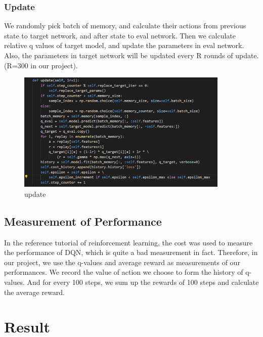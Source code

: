 \documentclass[12pt]{article}
\begin{document}
\subsubsection{Update}
We randomly pick batch of memory, and calculate their actions from previous state to target network, and after state to eval network. Then we calculate relative q values of target model, and update the parameters in eval network. Also, the parameters in target network will be updated every R rounds of update.(R=300 in our project).
\begin{figure}[H]
	\begin{center}
		\includegraphics[width=0.9\textwidth]{update}
		\caption{update}
	\end{center}
\end{figure}

\subsection{Measurement of Performance}
In the reference tutorial of reinforcement learning, the cost was used to measure the performance of DQN, which is quite a bad measurement in fact. Therefore, in our project, we use the q-values and average reward as measurements of our performances. We record the value of action we choose to form the history of q-values. And for every 100 steps, we sum up the rewards of 100 steps and calculate the average reward.



\section{Result}
\end{document}
